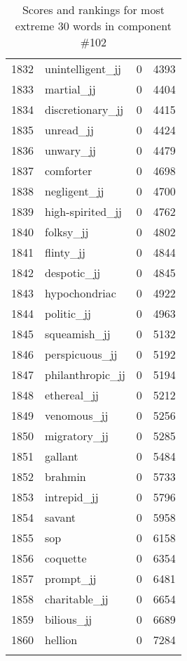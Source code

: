 \begin{longtable}[!htbp]{| rlr@{.}l |}
    1832 & unintelligent\_jj & 0 & 4393 \\
    1833 & martial\_jj & 0 & 4404 \\
    1834 & discretionary\_jj & 0 & 4415 \\
    1835 & unread\_jj & 0 & 4424 \\
    1836 & unwary\_jj & 0 & 4479 \\
    1837 & comforter & 0 & 4698 \\
    1838 & negligent\_jj & 0 & 4700 \\
    1839 & high-spirited\_jj & 0 & 4762 \\
    1840 & folksy\_jj & 0 & 4802 \\
    1841 & flinty\_jj & 0 & 4844 \\
    1842 & despotic\_jj & 0 & 4845 \\
    1843 & hypochondriac & 0 & 4922 \\
    1844 & politic\_jj & 0 & 4963 \\
    1845 & squeamish\_jj & 0 & 5132 \\
    1846 & perspicuous\_jj & 0 & 5192 \\
    1847 & philanthropic\_jj & 0 & 5194 \\
    1848 & ethereal\_jj & 0 & 5212 \\
    1849 & venomous\_jj & 0 & 5256 \\
    1850 & migratory\_jj & 0 & 5285 \\
    1851 & gallant & 0 & 5484 \\
    1852 & brahmin & 0 & 5733 \\
    1853 & intrepid\_jj & 0 & 5796 \\
    1854 & savant & 0 & 5958 \\
    1855 & sop & 0 & 6158 \\
    1856 & coquette & 0 & 6354 \\
    1857 & prompt\_jj & 0 & 6481 \\
    1858 & charitable\_jj & 0 & 6654 \\
    1859 & bilious\_jj & 0 & 6689 \\
    1860 & hellion & 0 & 7284 \\
    \hline
    \caption{Scores and rankings for most extreme 30 words in component \#102} \\
\end{longtable}

